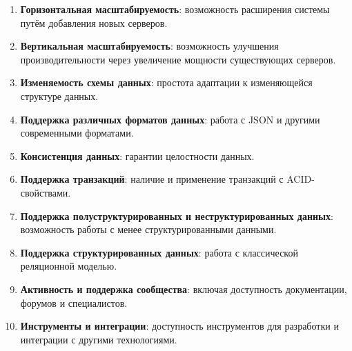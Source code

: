 \begin{enumerate}[wide=12.5mm, leftmargin=12.5mm]
    \item \textbf{Горизонтальная масштабируемость}: возможность расширения системы путём добавления новых серверов.
    \item \textbf{Вертикальная масштабируемость}: возможность улучшения производительности через увеличение мощности существующих серверов.
    \item \textbf{Изменяемость схемы данных}: простота адаптации к изменяющейся структуре данных.
    \item \textbf{Поддержка различных форматов данных}: работа с JSON и другими современными форматами.
    \item \textbf{Консистенция данных}: гарантии целостности данных.
    \item \textbf{Поддержка транзакций}: наличие и применение транзакций с ACID-свойствами.
    \item \textbf{Поддержка полуструктурированных и неструктурированных данных}: возможность работы с менее структурированными данными.
    \item \textbf{Поддержка структурированных данных}: работа с классической реляционной моделью.
    \item \textbf{Активность и поддержка сообщества}: включая доступность документации, форумов и специалистов.
    \item \textbf{Инструменты и интеграции}: доступность инструментов для разработки и интеграции с другими технологиями.
\end{enumerate}

